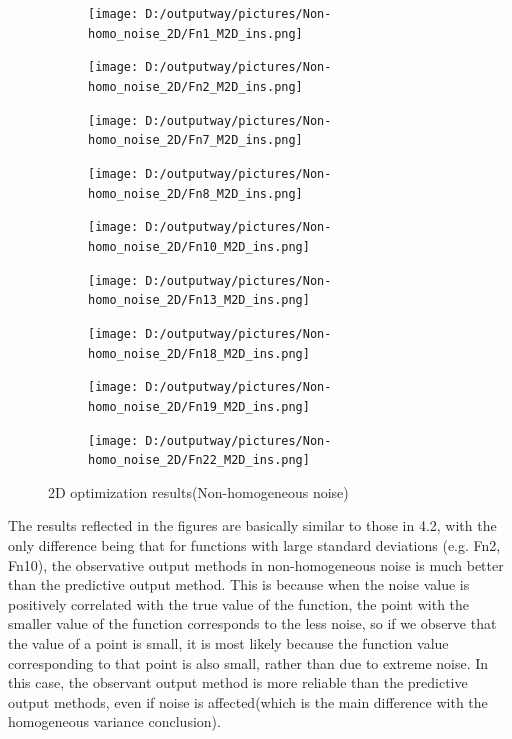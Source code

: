 \documentclass{article}
\begin{document}
\begin{figure}[H]
    \centering
    \begin{subfigure}[t]{.32\linewidth}
        \centering
        \texttt{[image: D:/outputway/pictures/Non-homo\_noise\_2D/Fn1\_M2D\_ins.png]}
    \end{subfigure}
    \begin{subfigure}[t]{.32\linewidth}
        \centering
        \texttt{[image: D:/outputway/pictures/Non-homo\_noise\_2D/Fn2\_M2D\_ins.png]}
    \end{subfigure}
    \begin{subfigure}[t]{.32\linewidth}
        \centering
        \texttt{[image: D:/outputway/pictures/Non-homo\_noise\_2D/Fn7\_M2D\_ins.png]}
    \end{subfigure}
    \begin{subfigure}[t]{.32\linewidth}
        \centering
        \texttt{[image: D:/outputway/pictures/Non-homo\_noise\_2D/Fn8\_M2D\_ins.png]}
    \end{subfigure}
    \begin{subfigure}[t]{.32\linewidth}
        \centering
        \texttt{[image: D:/outputway/pictures/Non-homo\_noise\_2D/Fn10\_M2D\_ins.png]}
    \end{subfigure}
    \begin{subfigure}[t]{.32\linewidth}
        \centering
        \texttt{[image: D:/outputway/pictures/Non-homo\_noise\_2D/Fn13\_M2D\_ins.png]}
    \end{subfigure}
    \begin{subfigure}[t]{.32\linewidth}
        \centering
        \texttt{[image: D:/outputway/pictures/Non-homo\_noise\_2D/Fn18\_M2D\_ins.png]}
    \end{subfigure}
    \begin{subfigure}[t]{.32\linewidth}
        \centering
        \texttt{[image: D:/outputway/pictures/Non-homo\_noise\_2D/Fn19\_M2D\_ins.png]}
    \end{subfigure}
    \begin{subfigure}[t]{.32\linewidth}
        \centering
        \texttt{[image: D:/outputway/pictures/Non-homo\_noise\_2D/Fn22\_M2D\_ins.png]}
    \end{subfigure}
    \caption{2D optimization results(Non-homogeneous noise)}
    \label{Fig5}
\end{figure}
The results reflected in the figures are basically similar to those in 4.2, with the only difference being that for functions with large standard deviations (e.g. Fn2, Fn10), the observative output methods in non-homogeneous noise is much better than the predictive output method. This is because when the noise value is positively correlated with the true value of the function, the point with the smaller value of the function corresponds to the less noise, so if we observe that the value of a point is small, it is most likely because the function value corresponding to that point is also small, rather than due to extreme noise. In this case, the observant output method is more reliable than the predictive output methods, even if noise is affected(which is the main difference with the homogeneous variance conclusion).
\end{document}
